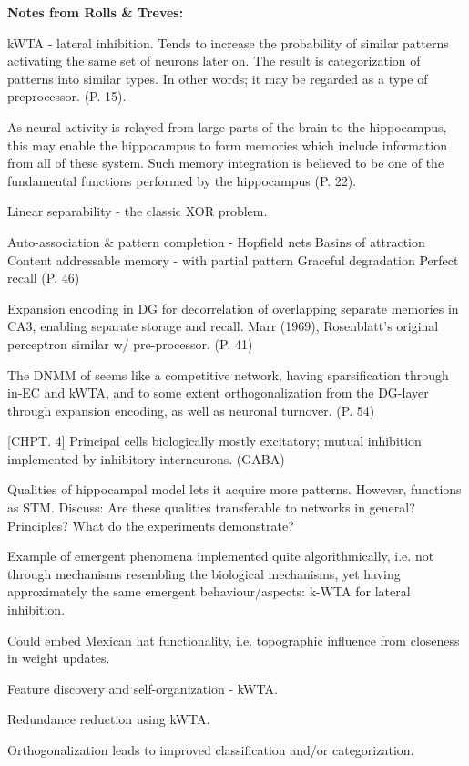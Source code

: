 \textbf{Notes from Rolls \& Treves:}

kWTA - lateral inhibition. Tends to increase the probability of similar patterns activating the same set of neurons later on. The result is categorization of patterns into similar types. In other words; it may be regarded as a type of preprocessor. (P. 15).

As neural activity is relayed from large parts of the brain to the hippocampus, this may enable the hippocampus to form memories which include information from all of these system. Such memory integration is believed to be one of the fundamental functions performed by the hippocampus (P. 22).

Linear separability - the classic XOR problem.

Auto-association \& pattern completion - Hopfield nets
Basins of attraction
Content addressable memory - with partial pattern
Graceful degradation
Perfect recall (P. 46)

Expansion encoding in DG for decorrelation of overlapping separate memories in CA3, enabling separate storage and recall. Marr (1969), Rosenblatt's original perceptron similar w/ pre-processor. (P. 41)

The DNMM of \cite{Hattori2014} seems like a competitive network, having sparsification through in-EC and kWTA, and to some extent orthogonalization from the DG-layer through expansion encoding, as well as neuronal turnover. (P. 54)

[CHPT. 4]
Principal cells biologically mostly excitatory; mutual inhibition implemented by inhibitory interneurons. (GABA)

Qualities of hippocampal model lets it acquire more patterns. However, functions as STM. Discuss: Are these qualities transferable to networks in general? Principles? What do the experiments demonstrate?

Example of emergent phenomena implemented quite algorithmically, i.e. not through mechanisms resembling the biological mechanisms, yet having approximately the same emergent behaviour/aspects: k-WTA for lateral inhibition.

Could embed Mexican hat functionality, i.e. topographic influence from closeness in weight updates.

Feature discovery and self-organization - kWTA.

Redundance reduction using kWTA.

Orthogonalization leads to improved classification and/or categorization.

